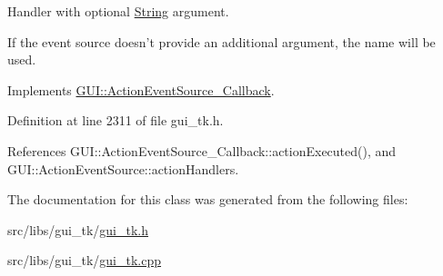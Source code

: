 Handler with optional \hyperlink{classGUI_1_1String}{String} argument. 

If the event source doesn't provide an additional argument, the name will be used. 

Implements \hyperlink{structGUI_1_1ActionEventSource__Callback_a36df23a424558a83b45e3e3d5c175cf2}{G\-U\-I\-::\-Action\-Event\-Source\-\_\-\-Callback}.



Definition at line 2311 of file gui\-\_\-tk.\-h.



References G\-U\-I\-::\-Action\-Event\-Source\-\_\-\-Callback\-::action\-Executed(), and G\-U\-I\-::\-Action\-Event\-Source\-::action\-Handlers.



The documentation for this class was generated from the following files\-:\begin{DoxyCompactItemize}
\item 
src/libs/gui\-\_\-tk/\hyperlink{gui__tk_8h}{gui\-\_\-tk.\-h}\item 
src/libs/gui\-\_\-tk/\hyperlink{gui__tk_8cpp}{gui\-\_\-tk.\-cpp}\end{DoxyCompactItemize}
